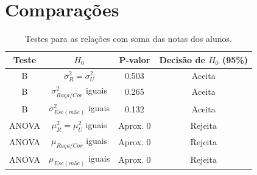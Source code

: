 

\chapter{Comparações\label{cap_normal}}
\begin{table}[htb]
\caption{Testes para as relações com soma
 das notas dos alunos.}
    \centering
    \begin{tabular}{cccc}
    \toprule
    Teste & $H_0$& P-valor & Decisão de $H_0$ (95\%)\\
    \midrule \midrule
    B & $\sigma_R^2 = \sigma_U^2$ & 0.503 & Aceita\\
    B & $\sigma_{Raça/Cor}^2$ iguais & 0.265 & Aceita\\
    B & $\sigma_{Esc(mãe)}^2$ iguais & 0.132 & Aceita\\
    ANOVA & $\mu_R^2 = \mu_U^2$ iguais & Aprox. 0 & Rejeita\\
    ANOVA & $\mu_{Raça/Cor}$ iguais & Aprox. 0 & Rejeita\\
    ANOVA & $\mu_{Esc(mãe)}$ iguais & Aprox. 0 & Rejeita\\
    \bottomrule
    \end{tabular}
\end{table}


